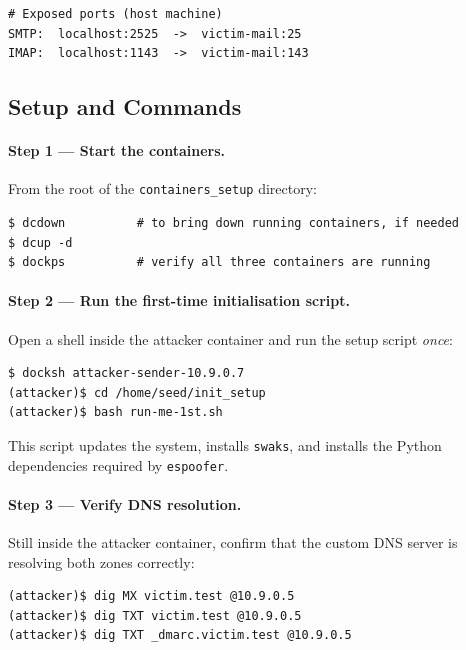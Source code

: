 \documentclass[11pt]{article}
\begin{document}
\begin{listing}[H]
\begin{verbatim}
# Exposed ports (host machine)
SMTP:  localhost:2525  ->  victim-mail:25
IMAP:  localhost:1143  ->  victim-mail:143
\end{verbatim}
\end{listing}

\subsection{Setup and Commands}

\paragraph{Step 1 --- Start the containers.}
From the root of the \texttt{containers\_setup} directory:

\begin{listing}[H]
\begin{verbatim}
$ dcdown          # to bring down running containers, if needed
$ dcup -d                    
$ dockps          # verify all three containers are running
\end{verbatim}
\end{listing}

\paragraph{Step 2 --- Run the first-time initialisation script.}
Open a shell inside the attacker container and run the setup script
\emph{once}:

\begin{listing}[H]
\begin{verbatim}
$ docksh attacker-sender-10.9.0.7
(attacker)$ cd /home/seed/init_setup
(attacker)$ bash run-me-1st.sh
\end{verbatim}
\end{listing}

This script updates the system, installs \texttt{swaks}, and installs
the Python dependencies required by \texttt{espoofer}.

\paragraph{Step 3 --- Verify DNS resolution.}
Still inside the attacker container, confirm that the custom DNS server
is resolving both zones correctly:

\begin{listing}[H]
\begin{verbatim}
(attacker)$ dig MX victim.test @10.9.0.5
(attacker)$ dig TXT victim.test @10.9.0.5
(attacker)$ dig TXT _dmarc.victim.test @10.9.0.5
\end{verbatim}
\end{listing}
\end{document}

